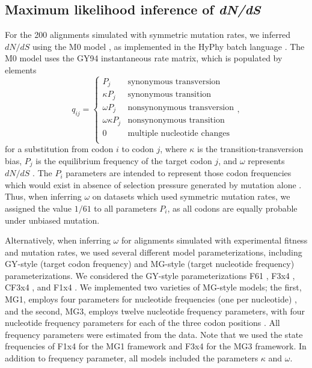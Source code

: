 \documentclass[11pt]{article}
\begin{document}
\subsection*{Maximum likelihood inference of \emph{dN/dS}}
For the 200 alignments simulated with symmetric mutation rates, we inferred $dN/dS$ using the M0 model \citep{Yangetal2000}, as implemented in the HyPhy batch language \citep{KosakovskyPondetal2005}. The M0 model uses the GY94 instantaneous rate matrix, which is populated by elements
\begin{equation}\label{eq:GY94}
q_{ij} = \left\{ 
	\begin{array}{rl}
	P_j                &\text{synonymous transversion} \\
	\kappa P_j           &\text{synonymous transition} \\
 	\omega P_j           &\text{nonsynonymous transversion} \\
 	\omega \kappa P_j    &\text{nonsynonymous transition} \\
	0                    &\text{multiple nucleotide changes} \\             
	\end{array} \right.,
\end{equation} for a substitution from codon $i$ to codon $j$, where $\kappa$ is the transition-transversion bias, $P_j$ is the equilibrium frequency of the target codon $j$, and $\omega$ represents $dN/dS$ \citep{GoldmanYang1994,NielsenYang1998}. The $P_i$ parameters are intended to represent those codon frequencies which would exist in absence of selection pressure generated by mutation alone \citep{GoldmanYang1994,MuseGaut1994,YN00,Yang2006}. Thus, when inferring $\omega$ on datasets which used symmetric mutation rates, we assigned the value $1/61$ to all parameters $P_i$, as all codons are equally probable under unbiased mutation.

Alternatively, when inferring $\omega$ for alignments simulated with experimental fitness and mutation rates, we used several different model parameterizations, including GY-style \citep{GoldmanYang1994} (target codon frequency) and MG-style \citep{MuseGaut1994} (target nucleotide frequency) parameterizations. We considered the GY-style parameterizations F61 \citep{GoldmanYang1994}, F3x4 \citep{GoldmanYang1994}, CF3x4 \citep{KosakovskyPond2010}, and F1x4 \citep{MuseGaut1994}. We implemented two varieties of MG-style models; the first, MG1, employs four parameters for nucleotide frequencies (one per nucleotide) \citep{MuseGaut1994}, and the second, MG3, employs twelve nucleotide frequency parameters, with four nucleotide frequency parameters for each of the three codon positions \citep{KosakovskyPondMuse2005}. All frequency parameters were estimated from the data. Note that we used the state frequencies of F1x4 for the MG1 framework and F3x4 for the MG3 framework. In addition to frequency parameter, all models included the parameters $\kappa$ and $\omega$.
\end{document}
